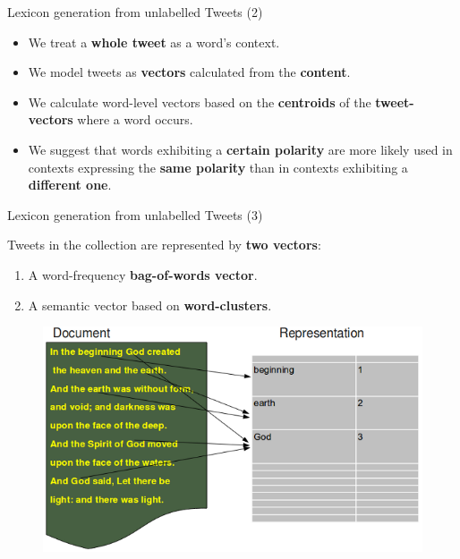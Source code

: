 \documentclass[handout]{beamer}
\begin{document}
\begin{frame}{Lexicon generation from unlabelled Tweets (2)}
\begin{scriptsize}
\begin{itemize}
\item We treat a \textbf{whole tweet} as a word's context.
\item We model tweets as \textbf{vectors} calculated from the \textbf{content}.
\item We calculate word-level vectors based on the \textbf{centroids} of the \textbf{tweet-vectors} where a word occurs.
\item We suggest that words exhibiting a \textbf{certain polarity} are more likely used in contexts expressing the \textbf{same polarity} than in contexts exhibiting a \textbf{different one}. 
\end{itemize}
\end{scriptsize}
\end{frame}



\begin{frame}{Lexicon generation from unlabelled Tweets (3)}
\begin{scriptsize}
Tweets in the collection are represented by \textbf{two vectors}:
\begin{enumerate} 
\item A word-frequency \textbf{bag-of-words vector}. 
\item A semantic vector based on \textbf{word-clusters}. 
\end{enumerate}
\begin{figure}[ht]
	\centering
	\includegraphics[scale=0.3]{pics/bow.png}
	\label{fig:word_clash}
\end{figure}

\end{scriptsize}
\end{frame}
\end{document}
